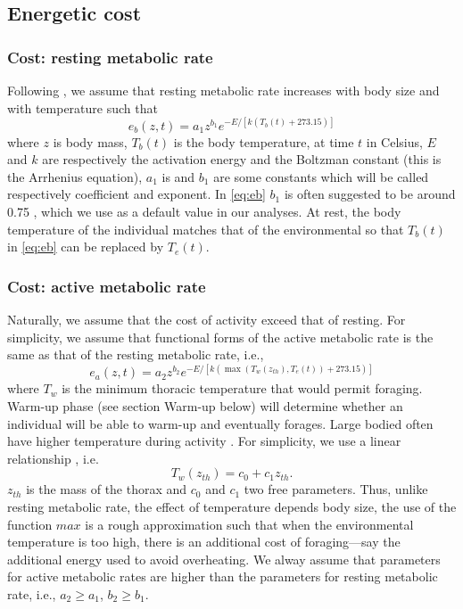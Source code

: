 \subsection*{Energetic cost}
\subsubsection*{Cost: resting metabolic rate}
Following \citet{Brown2004}, we assume that resting metabolic rate increases with body size and with temperature such that
\begin{equation} \label{eq:eb}
	e_b(z, t) = a_1 z^{b_1} e^{-E/[k (T_b(t)+ 273.15)]}
\end{equation}
where $z$ is body mass, $T_b(t)$ is the body temperature, at time $t$ in Celsius, $E$ and $k$ are respectively the activation energy and the Boltzman constant (this is the Arrhenius equation), $a_1$ is and $b_1$ are some constants which will be called respectively coefficient and exponent.
In \cref{eq:eb} $b_1$ is often suggested to be around 0.75 \citep{Kleiber1947, Peters1986, Brown2004}, which we use as a default value in our analyses.
At rest, the body temperature of the individual matches that of the environmental \citep[e.g.,][]{Bartholomew1978} so that $T_b(t)$ in \cref{eq:eb} can be replaced by $T_e(t)$.

\subsubsection*{Cost: active metabolic rate}
Naturally, we assume that the cost of activity exceed that of resting. 
For simplicity, we assume that functional forms of the active metabolic rate is the same as that of the resting metabolic rate, i.e.,
\begin{equation} \label{eq:ea}
	e_a(z,t) = a_2 z^{b_2}  e^{-E/[k (\max(T_w(z_{th}), T_e(t))+ 273.15)]}
\end{equation}
where $T_w$ is the minimum thoracic temperature that would permit foraging.
Warm-up phase (see section Warm-up below) will determine whether an individual will be able to warm-up and eventually forages.
Large bodied often have higher temperature during activity \citep{Bartholomew1977a}.
For simplicity, we use a linear relationship \citep{Bartholomew1977a}, i.e.
\begin{equation} \label{eq:Tw}
	T_w(z_{th}) = c_0+ c_1 z_{th}.
\end{equation}
$z_{th}$ is the mass of the thorax and $c_0$ and $c_1$ two free parameters.
Thus, unlike resting metabolic rate, the effect of temperature depends body size, the use of the function $max$ is a rough approximation such that when the environmental temperature is too high, there is an additional cost of foraging---say the additional energy used to avoid overheating. 
We alway assume that parameters for active metabolic rates are higher than the parameters for resting metabolic rate, i.e.,   $a_2 \geq a_1$, $b_2 \geq b_1$.

